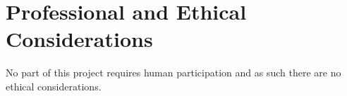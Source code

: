 \chapter{Professional and Ethical Considerations}\label{sec:professional}
No part of this project requires human participation and as such there are no
ethical considerations. 


